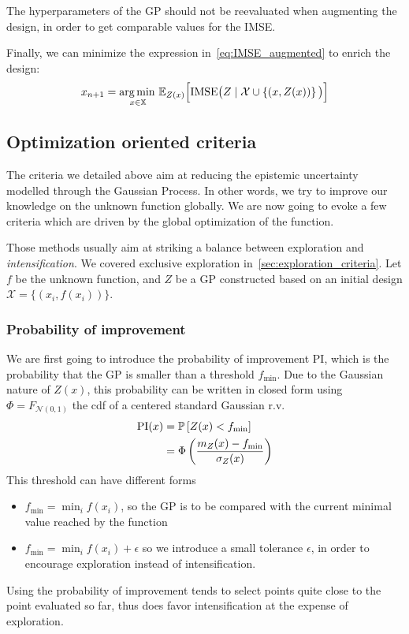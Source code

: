 \documentclass[../../Main_ManuscritThese.tex]{subfiles}
\begin{document}
The hyperparameters of the GP should not be reevaluated when augmenting the design, in order to get comparable values for the IMSE.\@

Finally, we can minimize the expression in~\cref{eq:IMSE_augmented} to enrich the design:
\begin{equation}
  x_{n+1} = \operatorname*{arg\,min \,}_{x\in \mathbb{X}}\mathbb{E}_{Z(x)}\Big[\mathrm{IMSE} \big(Z \mid \mathcal{X} \cup \left\{(x, Z(x))\right\} \big)\Big]
\end{equation}


\subsection{Optimization oriented criteria}
\label{sec:GP_optimization_criteria}
The criteria we detailed above aim at reducing the epistemic uncertainty modelled through the Gaussian Process. In other words, we try to improve our knowledge on the unknown function globally. We are now going to evoke a few criteria which are driven by the global optimization of the function.

Those methods usually aim at striking a balance between exploration and \emph{intensification}. We covered exclusive exploration in~\cref{sec:exploration_criteria}.
Let $f$ be the unknown function, and $Z$ be a GP constructed based on an initial design $\mathcal{X} = \{(x_i, f(x_i))\}$.
\subsubsection{Probability of improvement}
We are first going to introduce the probability of improvement $\mathrm{PI}$, which is the probability that the GP is smaller than a threshold $f_{\min}$. Due to the Gaussian nature of $Z(x)$, this probability can be written in closed form using $\Phi = F_{\mathcal{N}(0, 1)}$ the cdf of a centered standard Gaussian r.v.\
\begin{align}
  \mathrm{PI}(x) &= \Prob%
                   \left[Z(x) < f_{\min}\right] \\
                 &= \Phi\left(\frac{m_Z(x) - f_{\min}}{\sigma_Z(x)}\right)
\end{align}
This threshold can have different forms
\begin{itemize}
\item $f_{\min} = \min_{i} f(x_i)$, so the GP is to be compared with the current minimal value reached by the function
\item $f_{\min} = \min_i f(x_i) + \epsilon$ so we introduce a small tolerance $\epsilon$, in order to encourage exploration instead of intensification.
\end{itemize}
Using the probability of improvement tends to select points quite close to the point evaluated so far, thus does favor intensification at the expense of exploration.
\end{document}
